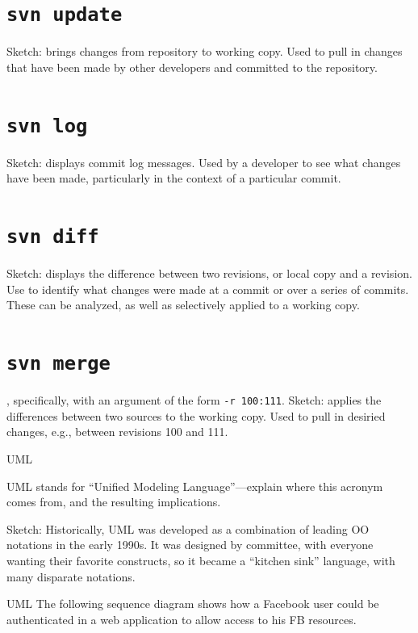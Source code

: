 \documentclass[11pt]{exam}
\begin{document}
\begin{questions}
\begin{parts}
\part[3] {\tt svn update}
Sketch: brings changes from repository to working copy. Used to pull in changes
that have been made by other developers and committed to the repository.
\vfill

\part[2] {\tt svn log}
Sketch: displays commit log messages. Used by a developer to see what changes
have been made, particularly in the context of a particular commit.
\vfill

\part[2] {\tt svn diff}
Sketch: displays the difference between two revisions, or local copy and a revision. 
Use to identify what changes were made at a commit or over a series of commits. These
can be analyzed, as well as selectively applied to a working copy.
\vfill

\part[3] {\tt svn merge}, specifically, with an argument of the form \texttt{-r 100:111}.
Sketch: applies the differences between two sources to the working copy.
Used to pull in desiried changes, e.g., between revisions 100 and 111.
\vfill

\end{parts}

\vfill

\newpage

\question[6] UML

UML stands for ``Unified Modeling Language''---explain where this acronym comes from,
and the resulting implications.

Sketch: Historically, UML was developed as a combination of leading OO notations in the early 1990s.
It was designed by committee, with everyone wanting their favorite constructs, so it became 
a ``kitchen sink'' language, with many disparate notations.

\newpage

\question[6] UML
The following sequence diagram
shows how a Facebook user could be authenticated in a web application to allow access to his FB resources. 


\end{questions}
\end{document}
